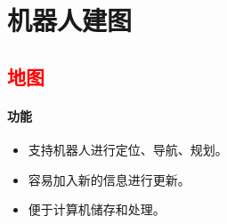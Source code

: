 \documentclass[
12pt, %
a4paper, 
oneside, %
]{scrartcl}
\begin{document}
\section{机器人建图}
\subsection[地图]{\textcolor{red}{地图}}
\paragraph{功能}
\begin{itemize}
\item 支持机器人进行定位、导航、规划。
\item 容易加入新的信息进行更新。
\item 便于计算机储存和处理。
\end{itemize}
\end{document}
